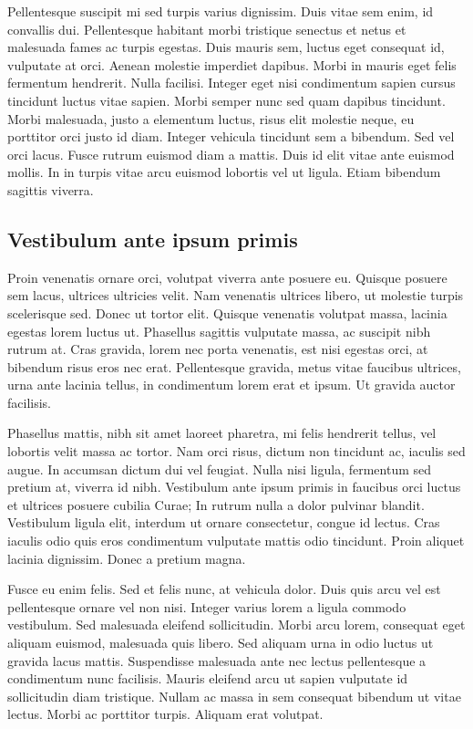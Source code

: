 Pellentesque suscipit mi sed turpis varius dignissim. Duis vitae sem enim, id convallis dui. Pellentesque habitant morbi tristique senectus et netus et malesuada fames ac turpis egestas. Duis mauris sem, luctus eget consequat id, vulputate at orci. Aenean molestie imperdiet dapibus. Morbi in mauris eget felis fermentum hendrerit. Nulla facilisi. Integer eget nisi condimentum sapien cursus tincidunt luctus vitae sapien. Morbi semper nunc sed quam dapibus tincidunt. Morbi malesuada, justo a elementum luctus, risus elit molestie neque, eu porttitor orci justo id diam. Integer vehicula tincidunt sem a bibendum. Sed vel orci lacus. Fusce rutrum euismod diam a mattis. Duis id elit vitae ante euismod mollis. In in turpis vitae arcu euismod lobortis vel ut ligula. Etiam bibendum sagittis viverra.

\subsection{Vestibulum ante ipsum primis}
Proin venenatis ornare orci, volutpat viverra ante posuere eu. Quisque posuere sem lacus, ultrices ultricies velit. Nam venenatis ultrices libero, ut molestie turpis scelerisque sed. Donec ut tortor elit. Quisque venenatis volutpat massa, lacinia egestas lorem luctus ut. Phasellus sagittis vulputate massa, ac suscipit nibh rutrum at. Cras gravida, lorem nec porta venenatis, est nisi egestas orci, at bibendum risus eros nec erat. Pellentesque gravida, metus vitae faucibus ultrices, urna ante lacinia tellus, in condimentum lorem erat et ipsum. Ut gravida auctor facilisis.

Phasellus mattis, nibh sit amet laoreet pharetra, mi felis hendrerit tellus, vel lobortis velit massa ac tortor. Nam orci risus, dictum non tincidunt ac, iaculis sed augue. In accumsan dictum dui vel feugiat. Nulla nisi ligula, fermentum sed pretium at, viverra id nibh. Vestibulum ante ipsum primis in faucibus orci luctus et ultrices posuere cubilia Curae; In rutrum nulla a dolor pulvinar blandit. Vestibulum ligula elit, interdum ut ornare consectetur, congue id lectus. Cras iaculis odio quis eros condimentum vulputate mattis odio tincidunt. Proin aliquet lacinia dignissim. Donec a pretium magna.

Fusce eu enim felis. Sed et felis nunc, at vehicula dolor. Duis quis arcu vel est pellentesque ornare vel non nisi. Integer varius lorem a ligula commodo vestibulum. Sed malesuada eleifend sollicitudin. Morbi arcu lorem, consequat eget aliquam euismod, malesuada quis libero. Sed aliquam urna in odio luctus ut gravida lacus mattis. Suspendisse malesuada ante nec lectus pellentesque a condimentum nunc facilisis. Mauris eleifend arcu ut sapien vulputate id sollicitudin diam tristique. Nullam ac massa in sem consequat bibendum ut vitae lectus. Morbi ac porttitor turpis. Aliquam erat volutpat.



